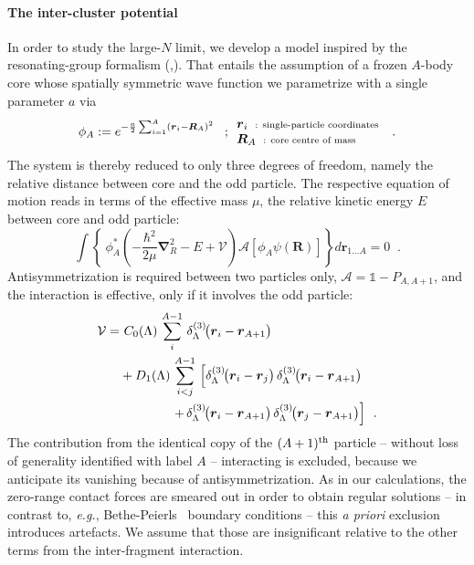 \documentclass[aps,nofootinbib,prl,showpacs,twocolumn,groupedaddress,superscriptaddress]
{revtex4}
\newcommand{\be}{\begin{equation}}
\newcommand{\ee}{\end{equation}}
\newcommand{\eg}{\textit{e.g.}\;}
\newcommand{\ve}[1]{\ensuremath{\boldsymbol{#1}}}
\newcommand{\ddrei}[1]{\delta_{\tiny \Lambda}^{(3)}\!\big(#1\big)}
\begin{document}
\paragraph{The inter-cluster potential}
In order to study the large-$N$ limit, we develop a model inspired by the resonating-group formalism
(\cite{Wheeler:1937zz},\cite{Wildermuth1977}).
That entails the assumption of a frozen $A$-body core whose spatially symmetric wave function we
parametrize with a single parameter $a$ via
\be\label{eq.rgm.corewfkt}
\phi_A:=e^{-\frac{a}{2}\sum_{i=1}^A\left(\ve{r}_i-\ve{R}_A\right)^2}\;\;\;;
\begin{array}{l}
     \ve{r}_i\;\;\text{\scriptsize : single-particle coordinates}  \\
     \ve{R}_A\;\;\text{\scriptsize : core centre of mass}
\end{array}\;\;.
\ee
The system is thereby reduced to only three degrees of freedom, namely the relative distance
between core and the odd particle. The respective equation of motion reads in terms of the effective
mass $\mu$, the relative kinetic energy $E$ between core and odd particle:
\be\label{eq.rgm.eqom}
\int\left\lbrace~\phi^*_A\left(-\frac{\hbar^2}{2\mu}\ve{\nabla}_R^2-E+\mathcal{V}\right)
\mathcal{A}\left[\phi_A\psi(\ve{R})\right]\right\rbrace d\ve{r}_{1\ldots A}=0\;\;.
\ee
Antisymmetrization is required between two particles only, 
$\mathcal{A}=\mathbb{1}-P_{A,A+1}$, 
and the interaction is effective, only if it involves the odd particle:
\begin{align}
\mathcal{V}=&~C_0(\Lambda)\,\sum_{i}^{A-1}\,\ddrei{\ve{r}_i-\ve{r}_{A+1}}\\
&+D_1(\Lambda)\,\sum^{A-1}_{i<j}\,\left[\ddrei{\ve{r}_i-\ve{r}_j}\,
\ddrei{\ve{r}_i-\ve{r}_{A+1}}\right.\\&\qquad\qquad\left.+
\,\ddrei{\ve{r}_i-\ve{r}_{A+1}}\,
\ddrei{\ve{r}_j-\ve{r}_{A+1}}\right]\;\,.
\end{align}
The contribution from the identical copy of the $(A+1)^\text{\scriptsize th}$ particle
-- without loss of generality identified with label $A$ -- interacting is excluded, 
because we anticipate its vanishing because of antisymmetrization.
As in our calculations, the zero-range contact forces are smeared out in order to 
obtain regular solutions -- in contrast to, \eg,
Bethe-Peierls~\cite{bethePeierls} boundary conditions 
-- this {\it a priori} exclusion introduces artefacts. We assume
that those are insignificant relative to the other terms from 
the inter-fragment interaction.
\end{document}
